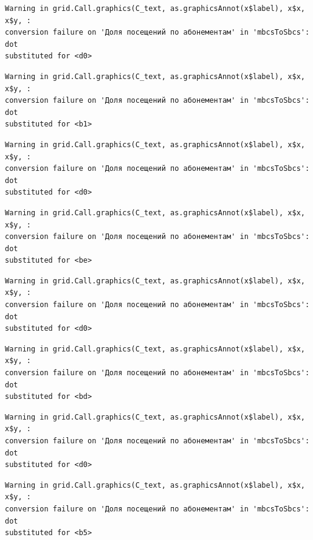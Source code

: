 \documentclass[
  letterpaper,
  DIV=11,
  numbers=noendperiod]{scrartcl}
\begin{document}
\begin{verbatim}
Warning in grid.Call.graphics(C_text, as.graphicsAnnot(x$label), x$x, x$y, :
conversion failure on 'Доля посещений по абонементам' in 'mbcsToSbcs': dot
substituted for <d0>
\end{verbatim}

\begin{verbatim}
Warning in grid.Call.graphics(C_text, as.graphicsAnnot(x$label), x$x, x$y, :
conversion failure on 'Доля посещений по абонементам' in 'mbcsToSbcs': dot
substituted for <b1>
\end{verbatim}

\begin{verbatim}
Warning in grid.Call.graphics(C_text, as.graphicsAnnot(x$label), x$x, x$y, :
conversion failure on 'Доля посещений по абонементам' in 'mbcsToSbcs': dot
substituted for <d0>
\end{verbatim}

\begin{verbatim}
Warning in grid.Call.graphics(C_text, as.graphicsAnnot(x$label), x$x, x$y, :
conversion failure on 'Доля посещений по абонементам' in 'mbcsToSbcs': dot
substituted for <be>
\end{verbatim}

\begin{verbatim}
Warning in grid.Call.graphics(C_text, as.graphicsAnnot(x$label), x$x, x$y, :
conversion failure on 'Доля посещений по абонементам' in 'mbcsToSbcs': dot
substituted for <d0>
\end{verbatim}

\begin{verbatim}
Warning in grid.Call.graphics(C_text, as.graphicsAnnot(x$label), x$x, x$y, :
conversion failure on 'Доля посещений по абонементам' in 'mbcsToSbcs': dot
substituted for <bd>
\end{verbatim}

\begin{verbatim}
Warning in grid.Call.graphics(C_text, as.graphicsAnnot(x$label), x$x, x$y, :
conversion failure on 'Доля посещений по абонементам' in 'mbcsToSbcs': dot
substituted for <d0>
\end{verbatim}

\begin{verbatim}
Warning in grid.Call.graphics(C_text, as.graphicsAnnot(x$label), x$x, x$y, :
conversion failure on 'Доля посещений по абонементам' in 'mbcsToSbcs': dot
substituted for <b5>
\end{verbatim}
\end{document}
